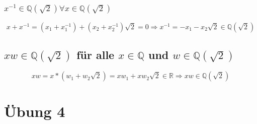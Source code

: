 \documentclass[a4paper,10pt]{article}
\begin{document}
\subsubsection*{$x^{-1} \in \mathbb{Q}(\sqrt{2}) \forall x \in \mathbb{Q}(\sqrt{2})$}

\begin{equation*}
 x + x^{-1} = (x_1 + x^{-1}_1) + (x_2 + x^{-1}_2)\sqrt{2} = 0 \Rightarrow x^{-1} = -x_1 - x_2\sqrt{2} \in \mathbb{Q}(\sqrt{2})
\end{equation*}

\subsection*{$xw \in \mathbb{Q}(\sqrt{2})$ für alle $x \in \mathbb{Q}$ und $w \in \mathbb{Q}(\sqrt{2})$}

\begin{equation*}
 xw = x * (w_1 + w_2\sqrt{2}) = xw_1 + xw_2\sqrt{2} \in \mathbb{R} \Rightarrow xw \in \mathbb{Q}(\sqrt{2})
\end{equation*}

\section*{Übung 4}
\end{document}

